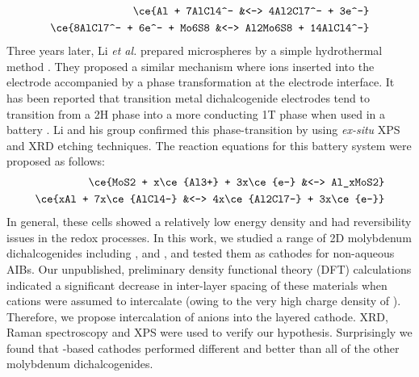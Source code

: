 \begin{align*}
          \ce{Al + 7AlCl4^- &<-> 4Al2Cl7^- + 3e^-}\\
\ce{8AlCl7^- + 6e^- + Mo6S8 &<-> Al2Mo6S8 + 14AlCl4^-}
\end{align*}
Three years later, Li \textit{et al.} prepared  microspheres by a simple hydrothermal method \cite{li_rechargeable_2018-1}. They proposed a similar mechanism where  ions inserted into the electrode accompanied by a phase transformation at the electrode interface. It has been reported that transition metal dichalcogenide electrodes tend to transition from a 2H phase into a more conducting 1T phase when used in a battery \cite{fan_hybrid_2017}. Li and his group confirmed this phase-transition by using \textit{ex-situ} XPS and XRD etching techniques. The reaction equations for this battery system were proposed as follows:
\begin{align*}
    \ce{MoS2 + x\ce{Al3+}  + 3x\ce{e-} &<-> Al_xMoS2}\\
    \ce{xAl + 7x\ce{AlCl4-} &<-> 4x\ce{Al2Cl7-} + 3x\ce{e-}}
\end{align*}
In general, these cells showed a relatively low energy density and had reversibility issues in the redox processes.
In this work, we studied a range of 2D molybdenum dichalcogenides including ,  and , and tested them as cathodes for non-aqueous AIBs. Our unpublished, preliminary density functional theory (DFT) calculations indicated a significant decrease in inter-layer spacing of these materials when  cations were assumed to intercalate (owing to the very high charge density of ). Therefore, we propose intercalation of  anions into the layered cathode. XRD, Raman spectroscopy and XPS were used to verify our hypothesis. Surprisingly we found that -based cathodes performed different and better than all of the other molybdenum dichalcogenides.
